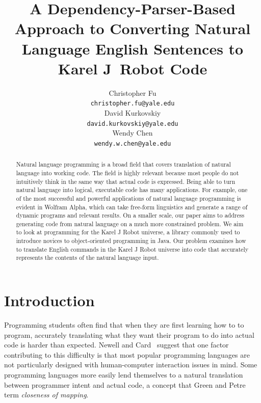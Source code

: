 \documentclass[11pt]{article}
\title{A Dependency-Parser-Based Approach to Converting Natural Language English Sentences to Karel J\ Robot Code}
\author{
    Christopher Fu \\
    \small{\texttt{christopher.fu@yale.edu}} \\ \And
    David Kurkovskiy \\
    \small{\texttt{david.kurkovskiy@yale.edu}} \\ \And
    Wendy Chen \\
    \small{\texttt{wendy.w.chen@yale.edu}} \\}
\date{}
\begin{document}
\maketitle
\begin{abstract}
Natural language programming is a broad field that covers translation of natural language into
working code.  The field is highly relevant because most people do not intuitively think in the
same way that actual code is expressed.  Being able to turn natural language into logical,
executable code has many applications.  For example, one of the most successful and powerful
applications of natural language programming is evident in Wolfram Alpha, which can take free-form
linguistics and generate a range of dynamic programs and relevant results.  On a smaller scale, our
paper aims to address generating code from natural language on a much more constrained problem.  We
aim to look at programming for the Karel J Robot universe, a library commonly used to introduce
novices to object-oriented programming in Java.  Our problem examines how to translate English
commands in the Karel J Robot universe into code that accurately represents the contents of the
natural language input.
\end{abstract}

\section{Introduction}
Programming students often find that when they are first learning how to to program, accurately
translating what they want their program to do into actual code is harder than expected. Newell and
Card~ suggest that one factor contributing to this difficulty is that most
popular programming languages are not particularly designed with human-computer interaction issues
in mind. Some programming languages more easily lend themselves to a natural translation between
programmer intent and actual code, a concept that Green and Petre~ term
\emph{closeness of mapping}.
\end{document}
